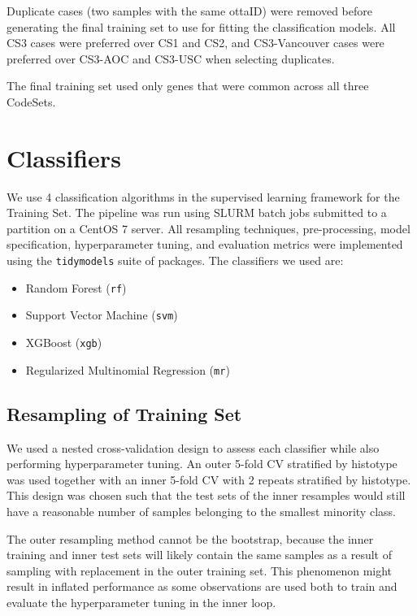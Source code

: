 \documentclass[
]{report}
\providecommand{\tightlist}{%
  \setlength{\itemsep}{0pt}\setlength{\parskip}{0pt}}
\begin{document}
Duplicate cases (two samples with the same ottaID) were removed before generating the final training set to use for fitting the classification models. All CS3 cases were preferred over CS1 and CS2, and CS3-Vancouver cases were preferred over CS3-AOC and CS3-USC when selecting duplicates.

The final training set used only genes that were common across all three CodeSets.

\section{Classifiers}\label{classifiers}

We use 4 classification algorithms in the supervised learning framework for the Training Set. The pipeline was run using SLURM batch jobs submitted to a partition on a CentOS 7 server. All resampling techniques, pre-processing, model specification, hyperparameter tuning, and evaluation metrics were implemented using the \texttt{tidymodels} suite of packages. The classifiers we used are:

\begin{itemize}
\tightlist
\item
  Random Forest (\texttt{rf})
\item
  Support Vector Machine (\texttt{svm})
\item
  XGBoost (\texttt{xgb})
\item
  Regularized Multinomial Regression (\texttt{mr})
\end{itemize}

\subsection{Resampling of Training Set}\label{resampling-of-training-set}

We used a nested cross-validation design to assess each classifier while also performing hyperparameter tuning. An outer 5-fold CV stratified by histotype was used together with an inner 5-fold CV with 2 repeats stratified by histotype. This design was chosen such that the test sets of the inner resamples would still have a reasonable number of samples belonging to the smallest minority class.

The outer resampling method cannot be the bootstrap, because the inner training and inner test sets will likely contain the same samples as a result of sampling with replacement in the outer training set. This phenomenon might result in inflated performance as some observations are used both to train and evaluate the hyperparameter tuning in the inner loop.
\end{document}
